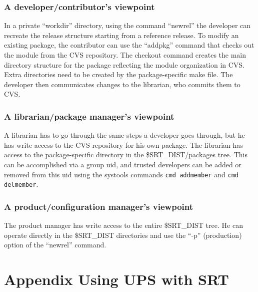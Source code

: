 \subsubsection{A developer/contributor's viewpoint}

    In a private ``workdir'' directory, using the command ``newrel'' the developer 
can recreate the release structure starting from a reference release. 
To modify an existing package,  the contributor can use the ``addpkg''
 command 
that checks out the module from the CVS repository. 
The checkout command creates the main directory structure for the package 
reflecting the module organization in CVS. Extra directories need to be 
created by the package-specific make file. The developer then 
communicates changes to the librarian, who commits them to CVS.

\subsubsection{A librarian/package manager's viewpoint}

\begin{sloppypar}
    A librarian has to go through the same steps a developer goes through, but 
he has write access to the CVS repository for his own 
package. The librarian has access to the package-specific directory in the 
\$SRT\_DIST/packages tree. This can be accomplished via a group uid, and 
trusted developers can be added or removed from this uid using the systools
commands \texttt{cmd addmember} and \texttt{cmd delmember}.
\end{sloppypar}

\subsubsection{A product/configuration manager's viewpoint}

    The product manager has write access to the entire \$SRT\_DIST tree. He can 
operate directly in the \$SRT\_DIST directories and use the ``-p'' (production) 
option of the ``newrel'' command. 

\section{Appendix Using UPS with SRT}
\label{app_ups}
 
